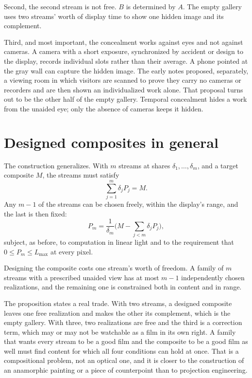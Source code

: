 Second, the second stream is not free. $B$ is determined by $A$. The empty gallery uses two streams' worth of display time to show one hidden image and its complement.

Third, and most important, the concealment works against eyes and not against cameras. A camera with a short exposure, synchronized by accident or design to the display, records individual slots rather than their average. A phone pointed at the gray wall can capture the hidden image. The early notes proposed, separately, a viewing room in which visitors are scanned to prove they carry no cameras or recorders and are then shown an individualized work alone. That proposal turns out to be the other half of the empty gallery. Temporal concealment hides a work from the unaided eye; only the absence of cameras keeps it hidden.

\section{Designed composites in general}

The construction generalizes. With $m$ streams at shares $\delta_1,\ldots,\delta_m$, and a target composite $M$, the streams must satisfy
\begin{equation}
\sum_{j=1}^m \delta_j P_j = M.
\end{equation}
Any $m-1$ of the streams can be chosen freely, within the display's range, and the last is then fixed:
\begin{equation}
P_m=\frac{1}{\delta_m}\Big(M-\sum_{j<m}\delta_jP_j\Big),
\end{equation}
subject, as before, to computation in linear light and to the requirement that $0\le P_m\le L_{\max}$ at every pixel.

\begin{proposition}
Designing the composite costs one stream's worth of freedom. A family of $m$ streams with a prescribed unaided view has at most $m-1$ independently chosen realizations, and the remaining one is constrained both in content and in range.
\end{proposition}

The proposition states a real trade. With two streams, a designed composite leaves one free realization and makes the other its complement, which is the empty gallery. With three, two realizations are free and the third is a correction term, which may or may not be watchable as a film in its own right. A family that wants every stream to be a good film and the composite to be a good film as well must find content for which all four conditions can hold at once. That is a compositional problem, not an optical one, and it is closer to the construction of an anamorphic painting or a piece of counterpoint than to projection engineering.

